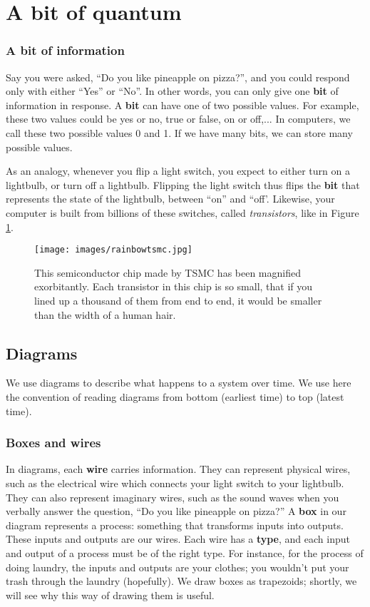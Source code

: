 \documentclass{article}
\begin{document}
\tableofcontents

\section{A bit of quantum}
\subsubsection{A \textbf{bit} of information}
Say you were asked, ``Do you like pineapple on pizza?'', and you could respond only with either ``Yes'' or ``No''.
In other words, you can only give one \textbf{bit} of information in response.
A \textbf{bit} can have one of two possible values.  For example, these two values could be yes or no, true or false, on or off,...
In computers, we call these two possible values 0 and 1.  If we have many bits, we can store many possible values.

As an analogy, whenever you flip a light switch, you expect to either turn on a lightbulb, or turn off a lightbulb.
Flipping the light switch thus flips the \textbf{bit} that represents the state of the lightbulb, between ``on'' and ``off'.
Likewise, your computer is built from billions of these switches, called \textit{transistors}, like in Figure \ref{fig:tsmc}.
\begin{figure}[h!]%
	\label{fig:tsmc}
	\texttt{[image: images/rainbowtsmc.jpg]}
	\caption{This semiconductor chip made by TSMC has been magnified exorbitantly.  Each transistor in this chip is so small, that if you lined up a thousand of them from end to end, it would be smaller than the width of a human hair.}
\end{figure}

\subsection{Diagrams}
We use diagrams to describe what happens to a system over time.  We use here the convention of reading diagrams from bottom (earliest time) to top (latest time).
\subsubsection{\textbf{Boxes} and \textbf{wires}}
In diagrams, each \textbf{wire} carries information.  They can represent physical wires, such as the electrical wire which connects your light switch to your lightbulb.  They can also represent imaginary wires, such as the sound waves when you verbally answer the question, ``Do you like pineapple on pizza?''
A \textbf{box} in our diagram represents a process: something that transforms inputs into outputs.
These inputs and outputs are our wires.  Each wire has a \textbf{type}, and each input and output of a process must be of the right type.  For instance, for the process of doing laundry, the inputs and outputs are your clothes; you wouldn't put your trash through the laundry (hopefully).
We draw boxes as trapezoids; shortly, we will see why this way of drawing them is useful.
\end{document}
